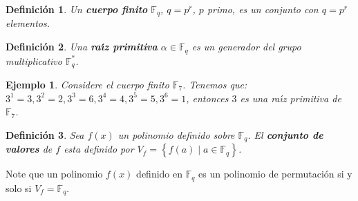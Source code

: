 \documentclass[landscape,final,paperwidth=24in,paperheight=36in]{baposter}
\newtheorem*{ejemplo*}{Ejemplo}
\newtheorem*{definicion*}{Definici\'on}
\begin{document}
\begin{poster}
{\begin{definicion*}
  Un \textbf{cuerpo finito} $\mathbb{F}_{q}$, $q=p^r$, $p$ primo, es un conjunto con $q=p^r$ elementos.
\end{definicion*}

\begin{definicion*}
  Una \textbf{ra\'{\i}z primitiva} $\alpha \in \mathbb{F}_q$ es un generador del grupo multiplicativo $\mathbb{F}_{q}^{*}$.
\end{definicion*}

\begin{ejemplo*}
  Considere el cuerpo finito $\mathbb{F}_{7}$. Tenemos que: $3^1 = 3, 3^2 = 2, 3^3 = 6, 3^4 = 4, 3^5 = 5, 3^6 = 1$, entonces $3$ es una ra\'{\i}z primitiva de $\mathbb{F}_{7}$.
\end{ejemplo*}

\begin{definicion*}
  Sea $f(x)$ un polinomio definido sobre $\mathbb{F}_{q}$. El \textbf{conjunto de valores} de $f$ esta definido por $V_{f} = \left\{f(a) \mid a \in \mathbb{F}_{q} \right\}$.
\end{definicion*}

Note que un polinomio $f(x)$ definido en $\mathbb{F}_{q}$ es un polinomio de permutaci\'on si y solo si $V_{f} = \mathbb{F}_{q}$.

}\label{Preliminaries}

\label{Applications}

\end{poster}
\end{document}
